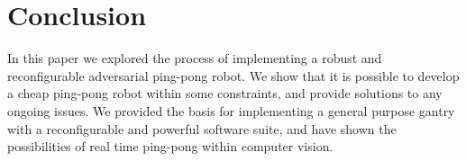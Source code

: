 \chapter{Conclusion}
In this paper we explored the process of implementing a robust and reconfigurable adversarial ping-pong robot. We show that it is possible to develop a cheap ping-pong robot within some constraints, and provide solutions to any ongoing issues. We provided the basis for implementing a general purpose gantry with a reconfigurable and powerful software suite, and have shown the possibilities of real time ping-pong within computer vision.